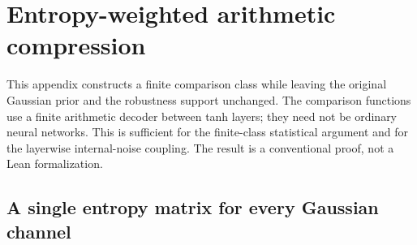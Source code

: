 \section{Entropy-weighted arithmetic compression}
\label{app:entropy-metric}

This appendix constructs a finite comparison class while leaving the
original Gaussian prior and the robustness support unchanged. The
comparison functions use a finite arithmetic decoder between tanh layers;
they need not be ordinary neural networks. This is sufficient for the
finite-class statistical argument and for the layerwise internal-noise
coupling. The result is a conventional proof, not a Lean formalization.

\subsection{A single entropy matrix for every Gaussian channel}


